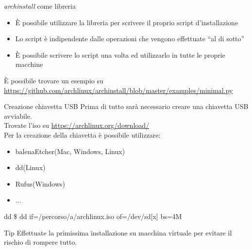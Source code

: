 \begin{frame}{\textit{archinstall} come libreria}
    \begin{itemize}
        \item È possibile utilizzare la libreria per scrivere il proprio script d'installazione
        \item Lo script è indipendente dalle operazioni che vengono effettuate ``al di sotto''
        \item È possibile scrivere lo script una volta ed utilizzarlo in tutte le proprie macchine
    \end{itemize}

    È possibile trovare un esempio su
    \url{https://github.com/archlinux/archinstall/blob/master/examples/minimal.py}
\end{frame}

\begin{frame}{Creazione chiavetta USB}
    Prima di tutto sarà necessario creare una chiavetta USB avviabile.\\Trovate l'iso su \url{https://archlinux.org/download/}\\
    Per la creazione della chiavetta è possibile utilizzare:
    \begin{itemize}
        \item balenaEtcher(Mac, Windows, Linux)
        \item dd(Linux)
        \item Rufus(Windows)
        \item ...
    \end{itemize}

    \begin{block}{dd}
        \$ dd if=/percorso/a/archlinux.iso of=/dev/sd[x] bs=4M\\
    \end{block}
    \begin{alertblock}{Tip}
        Effettuate la primissima installazione su macchina virtuale per evitare il rischio di rompere tutto.
    \end{alertblock}
\end{frame}

